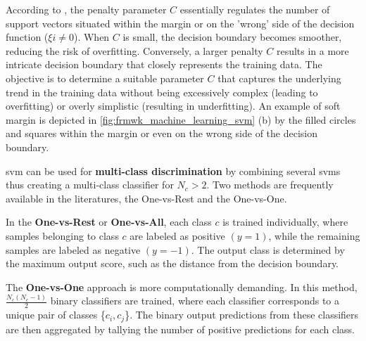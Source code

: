 
According to \textcite{Rothmund2018}, the penalty parameter $C$ essentially regulates the number of support vectors situated within the margin or on the 'wrong' side of the decision function ($\xi i \neq 0$). When $C$ is small, the decision boundary becomes smoother, reducing the risk of overfitting. Conversely, a larger penalty $C$ results in a more intricate decision boundary that closely represents the training data. The objective is to determine a suitable parameter $C$ that captures the underlying trend in the training data without being excessively complex (leading to overfitting) or overly simplistic (resulting in underfitting). An example of soft margin is depicted in \ref{fig:frmwk_machine_learning_svm} (b) by the filled circles and squares within the margin or even on the wrong side of the decision boundary.

\gls{svm} can be used for \textbf{multi-class discrimination} by combining several \gls{svm}s thus creating a multi-class classifier for $N_c > 2$. Two methods are frequently available in the literatures, the One-vs-Rest and the One-vs-One.

In the \textbf{One-vs-Rest} or \textbf{One-vs-All}, each class $c$ is trained individually, where samples belonging to class $c$ are labeled as positive $(y = 1)$, while the remaining samples are labeled as negative $(y = -1)$. The output class is determined by the maximum output score, such as the distance from the decision boundary.


The \textbf{One-vs-One} approach is more computationally demanding. In this method, $\frac{N_c(N_c-1)}{2}$ binary classifiers are trained, where each classifier corresponds to a unique pair of classes \{$c_i, c_j$\}. The binary output predictions from these classifiers are then aggregated by tallying the number of positive predictions for each class.


